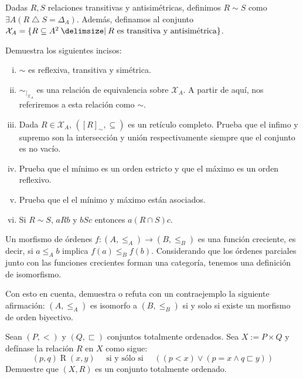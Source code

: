 \begin{exercise}[parzfc=2]
  Dadas $R,S$ relaciones transitivas y antisimétricas, definimos $R\sim S$ como ${\exists A (R\bigtriangleup S = \Delta_A)}$. Además, definamos al conjunto $\mathcal{X}_A=\set{R\subseteq A^2\st R \text{ es transitiva y antisimétrica}}$.
  
  Demuestra los siguientes incisos:
  \begin{enumerate}[i)]
      \item $\sim$ es reflexiva, transitiva y simétrica.
      \item $\sim_{|_{\mathcal{X}_A}}$ es una relación de equivalencia sobre $\mathcal{X}_A$. A partir de aquí, nos referiremos a esta relación como $\sim$.
      \item Dada $R\in \mathcal{X}_A$, $([R]_\sim, \subseteq)$ es un retículo completo. Prueba que el infimo y supremo son la intersección y unión respectivamente siempre que el conjunto es no vacío.
      \item Prueba que el mínimo es un orden estricto y que el máximo es un orden reflexivo.
      \item Prueba que el el mínimo y máximo están asociados.
      \item Si $R\sim S$, $aRb$ y $bSc$ entonces $a(R\cap S) c$.
  \end{enumerate}
  
\end{exercise}

\begin{exercise}
  Un morfismo de órdenes $f\colon (A,\leq_A)\to (B,\leq_B)$ es una función creciente, es decir, si $a\leq_A b$ implica $f(a)\leq_B f(b)$. Considerando que los órdenes parciales junto con las funciones crecientes forman una categoría, tenemos una definición de isomorfismo.

  Con esto en cuenta, demuestra o refuta con un contraejemplo la siguiente afirmación: $(A,\leq_A)$ es isomorfo a $(B,\leq_B)$ si y solo si existe un morfismo de orden biyectivo.
\end{exercise}

\begin{exercise}[parzfc=2, tezfc=2]
  Sean $(P,<)$ y $(Q,\sqsubset)$ conjuntos totalmente ordenados. Sea $X:=P \times Q$ y defínase la relación $R$ en $X$ como sigue:
  \[ (p,q) \mathrel{R} (x,y) \quad \text{ si y sólo si } \quad \left( \left( p < x \right) \lor \left( p=x \land q \sqsubset y \right) \right) \]
  Demuestre que $(X,R)$ es un conjunto totalmente ordenado.
\end{exercise}

